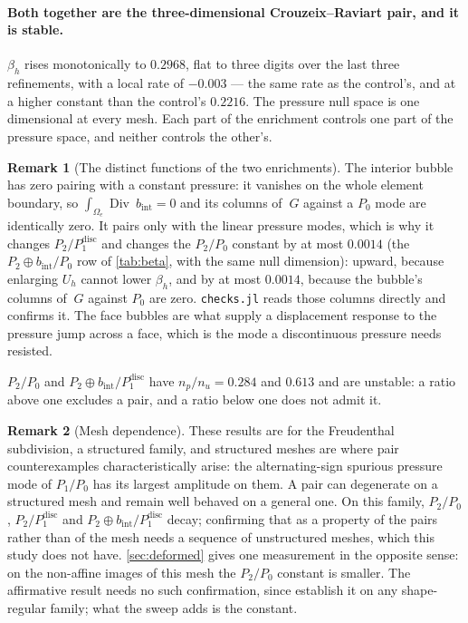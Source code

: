 \documentclass{article}
\newcommand{\Div}{\operatorname{Div}}
\newcommand{\code}[1]{\texttt{#1}}
\theoremstyle{definition}
\newtheorem{remark}{Remark}
\theoremstyle{plain}
\begin{document}
\paragraph{Both together are the three-dimensional Crouzeix--Raviart pair, and
it is stable.} $\beta_h$ rises monotonically to $0.2968$, flat to three digits
over the last three refinements, with a local rate of $-0.003$ --- the
same rate as the control's, and at a higher constant than the control's
$0.2216$. The pressure null space is one dimensional at every mesh. Each part
of the enrichment controls one part of the pressure space, and neither
controls the other's.

\begin{remark}[The distinct functions of the two enrichments]
\label{rem:whyface}
The interior bubble has zero pairing with a constant pressure: it vanishes on
the whole element boundary, so $\int_{\Omega_e}\!\Div ~b_{\mathrm{int}} = 0$
and its columns of $~G$ against a $P_0$ mode are identically zero. It pairs
only with the linear pressure modes, which is why it changes
$P_2/P_1^{\mathrm{disc}}$ and changes the $P_2/P_0$ constant by at most
$0.0014$ (the $P_2 \oplus b_{\mathrm{int}}/P_0$ row of \cref{tab:beta},
with the same null dimension): upward, because enlarging $U_h$ cannot lower
$\beta_h$, and by at most $0.0014$, because the bubble's columns of $~G$
against $P_0$ are zero.
\code{checks.jl} reads those columns directly and confirms it. The face bubbles are what supply a displacement response to
the pressure jump across a face, which is the mode a discontinuous pressure
needs resisted.
\end{remark}

$P_2/P_0$ and $P_2 \oplus b_{\mathrm{int}}/P_1^{\mathrm{disc}}$ have
$n_p/n_u = 0.284$ and $0.613$ and are unstable: a ratio above one excludes a
pair, and a ratio below one does not admit it.

\begin{remark}[Mesh dependence]
\label{rem:structured}
These results are for the Freudenthal subdivision, a structured family, and
structured meshes are where pair counterexamples characteristically arise:
the alternating-sign spurious pressure mode of $P_1/P_0$ has its largest
amplitude on them. A pair can degenerate on a structured mesh and remain well
behaved on a general one. On this family, $P_2/P_0$,
$P_2/P_1^{\mathrm{disc}}$ and $P_2 \oplus b_{\mathrm{int}}/P_1^{\mathrm{disc}}$
decay; confirming that as a property of the pairs rather than of the mesh
needs a sequence of unstructured meshes, which this study does not have.
\cref{sec:deformed} gives one measurement in the opposite sense: on the
non-affine images of this mesh the $P_2/P_0$ constant is smaller. The affirmative result
needs no such confirmation, since \textcite[Example~8.7.2]{BoffiBrezziFortin:2013}
establish it on any shape-regular family; what the sweep adds is the constant.
\end{remark}
\end{document}

